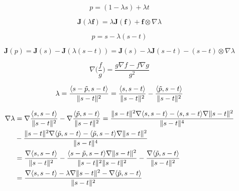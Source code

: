 \documentclass[11pt]{article} %
\DeclarePairedDelimiter{\norm}{\lVert}{\rVert}
\begin{document}
%
\begin{equation}
p = (1 - \lambda s) + \lambda t
\end{equation}

\begin{equation}
\textbf{J}(\lambda \textbf{f}) = \lambda \textbf{J}(\textbf{f}) + \textbf{f} \otimes \nabla\lambda
\end{equation}

\begin{equation}
p = s - \lambda (s - t)
\end{equation}

\begin{equation}
\textbf{J}(p) = \textbf{J}(s) - \textbf{J}(\lambda (s - t)) = \textbf{J}(s) - \lambda \textbf{J}(s - t) - (s - t) \otimes\nabla\lambda 
\end{equation}

\begin{equation}
\nabla\Big(\frac{f}{g}\Big) = \frac{g \nabla f - f \nabla g}{g^{2}}
\end{equation}

\begin{equation}
\lambda = \frac{\langle s - \tilde{p}, s - t \rangle}{\norm{s - t}^{2}} = \frac{\langle s, s - t \rangle}{\norm{s - t}^{2}} - \frac{\langle \tilde{p}, s - t \rangle}{\norm{s - t}^{2}}
\end{equation}

\begin{align}
\nabla\lambda &= \nabla\frac{\langle s, s - t \rangle}{\norm{s - t}^{2}} - \nabla\frac{\langle \tilde{p}, s - t \rangle}{\norm{s - t}^{2}} = \frac{\norm{s - t}^{2} \nabla\langle s, s - t \rangle - \langle s, s - t \rangle \nabla\norm{s - t}^{2}}{\norm{s - t}^{4}} \\
&- \frac{\norm{s - t}^{2} \nabla\langle \tilde{p}, s - t \rangle - \langle\tilde{p}, s - t \rangle \nabla\norm{s - t}^{2}}{\norm{s - t}^{4}} \\
&=  \frac{\nabla\langle s, s - t \rangle}{\norm{s - t}^{2}} - \frac{\langle s - \tilde{p}, s - t \rangle \nabla\norm{s - t}^{2}}
{\norm{s - t}^{2} \norm{s - t}^{2}} - \frac{\nabla\langle \tilde{p}, s - t \rangle}{\norm{s - t}^{2}}\\
&=  \frac{\nabla\langle s, s - t \rangle - \lambda\nabla\norm{s - t}^{2} - \nabla\langle \tilde{p}, s - t \rangle}{\norm{s - t}^{2}}
\end{align}
\end{document}
